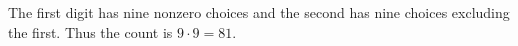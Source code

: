 The first digit has nine nonzero choices and the second has nine choices excluding the first. Thus the count is $9\cdot9=\boxed{81}$.
